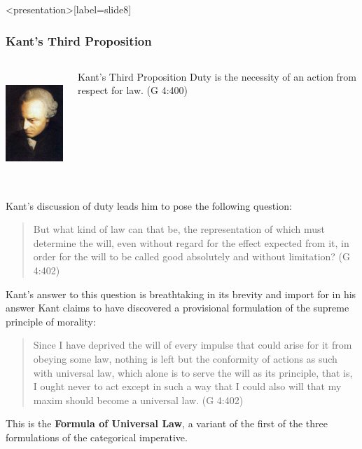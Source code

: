 \begin{frame}<presentation>[label=slide8]
    \frametitle{Kant's Third Proposition}
        \begin{columns}
            \begin{column}{3cm}
                \includegraphics[height=4cm]{../../../graphics/kant.jpg}
            \end{column}
            \begin{column}{7cm}
                \begin{block}{Kant's Third Proposition}
                	Duty is the necessity of an action from respect for law. (G 4:400)
                \end{block}
            \end{column}
        \end{columns}
\end{frame}

Kant's discussion of duty leads him to pose the following question:

\begin{quote}
	But what kind of law can that be, the representation of which must determine the will, even without regard for the effect expected from it, in order for the will to be called good absolutely and without limitation? (G 4:402)
\end{quote}

Kant's answer to this question is breathtaking in its brevity and import for in his answer Kant claims to have discovered a provisional formulation of the supreme principle of morality:

\begin{quote}
	Since I have deprived the will of every impulse that could arise for it from obeying some law, nothing is left but the conformity of actions as such with universal law, which alone is to serve the will as its principle, that is, I ought never to act except in such a way that I could also will that my maxim should become a universal law. (G 4:402)
\end{quote}

This is the \textbf{Formula of Universal Law}, a variant of the first of the three formulations of the categorical imperative. \change

